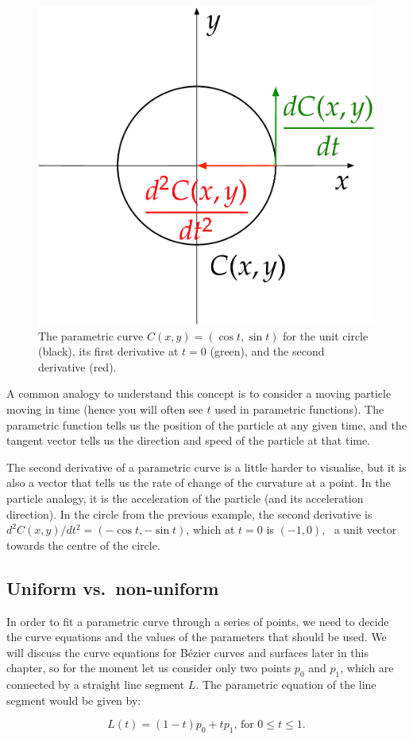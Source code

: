 \begin{figure}
\centering
\includegraphics[width=0.4\linewidth]{figs/derivatives}
\caption{The parametric curve \(C(x,y) = (\cos t, \sin t)\) for the unit circle (black), its first derivative at \(t=0\) (green), and the second derivative (red).}%
\label{fig:derivatives}
\end{figure}

A common analogy to understand this concept is to consider a moving particle moving in time (hence you will often see \(t\) used in parametric functions).
The parametric function tells us the position of the particle at any given time, and the tangent vector tells us the direction and speed of the particle at that time.

The second derivative of a parametric curve is a little harder to visualise, but it is also a vector that tells us the rate of change of the curvature at a point.
In the particle analogy, it is the acceleration of the particle (and its acceleration direction).
In the circle from the previous example, the second derivative is \(d^2C(x,y)/dt^2 = (-\cos t, -\sin t)\), which at \(t=0\) is \((-1, 0)\), \ie\ a unit vector towards the centre of the circle.

\subsection{Uniform vs.\ non-uniform}

In order to fit a parametric curve through a series of points, we need to decide the curve equations and the values of the parameters that should be used.
We will discuss the curve equations for B\'ezier curves and surfaces later in this chapter, so for the moment let us consider only two points \(p_0\) and \(p_1\), which are connected by a straight line segment \(L\).
The parametric equation of the line segment would be given by:

\begin{equation}
\label{eq:line}
L(t) = (1-t)p_0 + tp_1\text{, for }0 \leq t \leq 1.
\end{equation}

